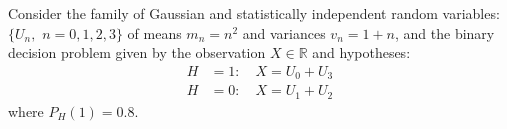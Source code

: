 \question Consider the family of Gaussian and statistically independent random variables:
$\{U_n, \,\,n=0,1,2, 3\}$
of means $m_n = n^2$ and variances $v_n = 1+n$, and the binary decision problem given by the observation $X \in \mathbb{R}$ and hypotheses:
\begin{align*}
    H &=1: \quad X = U_0 + U_3 \\
    H &=0: \quad X = U_1 + U_2
\end{align*}
where $P_H(1) = 0.8$.


